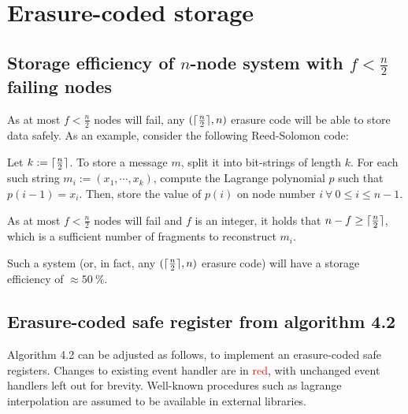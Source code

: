 \documentclass[a4paper]{scrreprt}
\DeclarePairedDelimiter{\ceil}{\lceil}{\rceil}
\begin{document}
\section{Erasure-coded storage}

\subsection{Storage efficiency of $n$-node system with $f < \frac{n}{2}$ failing nodes}

As at most $f < \frac{n}{2}$ nodes will fail, any $(\ceil{\frac{n}{2}}, n)$
erasure code will be able to store data safely. As an example, consider the
following Reed-Solomon code:

Let $k := \ceil{\frac{n}{2}}$. To store a message $m$, split it into
bit-strings of length $k$. For each such string $m_i := (x_1, \cdots, x_k)$,
compute the Lagrange polynomial $p$ such that $p(i - 1) = x_i$. Then, store the
value of $p(i)$ on node number $i\ \forall\ 0 \leq i \leq n - 1$.

As at most $f < \frac{n}{2}$ nodes will fail and $f$ is an integer, it holds
that $n - f \geq \ceil{\frac{n}{2}}$, which is a sufficient number of fragments
to reconstruct $m_i$.

Such a system (or, in fact, any $(\ceil{\frac{n}{2}}, n)$ erasure code) will
have a storage efficiency of $\approx \SI{50}{\percent}$.

\subsection{Erasure-coded safe register from algorithm 4.2}

Algorithm 4.2 can be adjusted as follows, to implement an erasure-coded safe
registers. Changes to existing event handler are in \textcolor{red}{red}, with
unchanged event handlers left out for brevity. Well-known procedures such as
lagrange interpolation are assumed to be available in external libraries.
\end{document}
